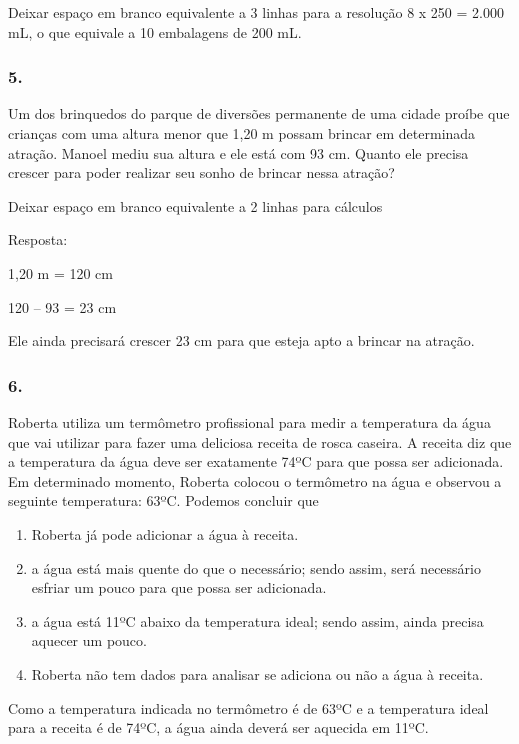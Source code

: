\begin{enumerate}
\begin{escolha}
\begin{enumerate}
\begin{itemize}
\begin{itemize}
\begin{escolha}
Deixar espaço em branco equivalente a 3 linhas para a resolução
8 x 250 = 2.000 mL, o que equivale a 10 embalagens de 200 mL.


\subsubsection{5.}\label{section-43}

Um dos brinquedos do parque de diversões permanente de uma cidade proíbe
que crianças com uma altura menor que 1,20 m possam brincar em determinada
atração. Manoel mediu sua altura e ele está com 93 cm. Quanto ele
precisa crescer para poder realizar seu sonho de brincar nessa atração?

Deixar espaço em branco equivalente a 2 linhas para cálculos

Resposta:

1,20 m = 120 cm

120 -- 93 = 23 cm

Ele ainda precisará crescer 23 cm para que esteja apto a brincar na atração.

\subsubsection{6.}\label{section-44}

Roberta utiliza um termômetro profissional para medir a temperatura da
água que vai utilizar para fazer uma deliciosa receita de rosca
caseira. A receita diz que a temperatura da água deve ser exatamente 74ºC
para que possa ser adicionada. Em determinado momento, Roberta colocou
o termômetro na água e observou a seguinte temperatura: 63ºC. Podemos concluir que

\begin{enumerate}
\def\labelenumi{\alph{enumi})}
\item
  Roberta já pode adicionar a água à receita.
\item
  a água está mais quente do que o necessário; sendo assim, será
  necessário esfriar um pouco para que possa ser adicionada.
\item
  a água está 11ºC abaixo da temperatura ideal; sendo assim, ainda
  precisa aquecer um pouco.
\item
  Roberta não tem dados para analisar se adiciona ou não a água à receita.
\end{enumerate}

Como a temperatura indicada no termômetro é de 63ºC e a temperatura
ideal para a receita é de 74ºC, a água ainda deverá ser aquecida em 11ºC.


\end{escolha}
\end{itemize}
\end{itemize}
\end{enumerate}
\end{escolha}
\end{enumerate}
